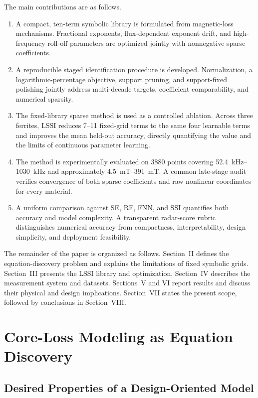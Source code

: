 \documentclass[lettersize,journal]{IEEEtran}
\begin{document}
The main contributions are as follows.
\begin{enumerate}
\item A compact, ten-term symbolic library is formulated from magnetic-loss mechanisms. Fractional exponents, flux-dependent exponent drift, and high-frequency roll-off parameters are optimized jointly with nonnegative sparse coefficients.
\item A reproducible staged identification procedure is developed. Normalization, a logarithmic-percentage objective, support pruning, and support-fixed polishing jointly address multi-decade targets, coefficient comparability, and numerical sparsity.
\item The fixed-library sparse method is used as a controlled ablation. Across three ferrites, LSSI reduces 7--11 fixed-grid terms to the same four learnable terms and improves the mean held-out accuracy, directly quantifying the value and the limits of continuous parameter learning.
\item The method is experimentally evaluated on 3880 points covering \SIrange{52.4}{1030}{\kilo\hertz} and approximately \SIrange{4.5}{391}{\milli\tesla}. A common late-stage audit verifies convergence of both sparse coefficients and raw nonlinear coordinates for every material.
\item A uniform comparison against SE, RF, FNN, and SSI quantifies both accuracy and model complexity. A transparent radar-score rubric distinguishes numerical accuracy from compactness, interpretability, design simplicity, and deployment feasibility.
\end{enumerate}

The remainder of the paper is organized as follows. Section~II defines the equation-discovery problem and explains the limitations of fixed symbolic grids. Section~III presents the LSSI library and optimization. Section~IV describes the measurement system and datasets. Sections~V and VI report results and discuss their physical and design implications. Section~VII states the present scope, followed by conclusions in Section~VIII.

\section{Core-Loss Modeling as Equation Discovery}
\subsection{Desired Properties of a Design-Oriented Model}
\end{document}
